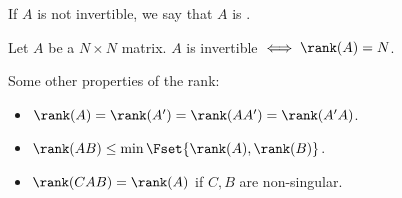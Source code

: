 \documentclass{article}
\begin{document}
\begin{definition}
  If $A$ is not invertible, we say that $A$ is .
\end{definition}

\begin{theorem}
  Let $A$ be a $N \times N$ matrix. $A$ is invertible $\iff \rank(A) = N$.
\end{theorem}

Some other properties of the rank:
\begin{itemize}[label=$\bullet$]
  \item $\rank(A) = \rank(A^\prime) = \rank(A A^\prime) = \rank(A^\prime A)$.
  \item $\rank(AB) \le \min\Fset{\rank(A), \rank(B)}$.
  \item $\rank(CAB) = \rank(A)$ if $C, B$ are non-singular.
\end{itemize}
\end{document}
